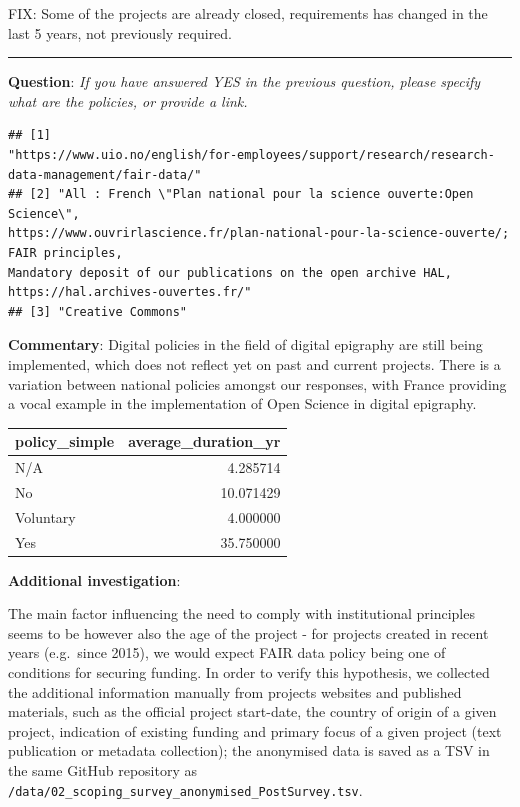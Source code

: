 \documentclass[
  12pt,
]{scrreprt}
\begin{document}
FIX: Some of the projects are already closed, requirements has changed
in the last 5 years, not previously required.

\begin{center}\rule{0.5\linewidth}{0.5pt}\end{center}

\textbf{Question}: \emph{If you have answered YES in the previous
question, please specify what are the policies, or provide a link.}

\begin{verbatim}
## [1]
"https://www.uio.no/english/for-employees/support/research/research-data-management/fair-data/"
## [2] "All : French \"Plan national pour la science ouverte:Open Science\",
https://www.ouvrirlascience.fr/plan-national-pour-la-science-ouverte/; FAIR principles,
Mandatory deposit of our publications on the open archive HAL,
https://hal.archives-ouvertes.fr/"
## [3] "Creative Commons"
\end{verbatim}

\textbf{Commentary}: Digital policies in the field of digital epigraphy
are still being implemented, which does not reflect yet on past and
current projects. There is a variation between national policies amongst
our responses, with France providing a vocal example in the
implementation of Open Science in digital epigraphy.

\begin{longtable}[]{@{}lr@{}}
\toprule
policy\_simple & average\_duration\_yr \\
\midrule
\endhead
N/A & 4.285714 \\
No & 10.071429 \\
Voluntary & 4.000000 \\
Yes & 35.750000 \\
\bottomrule
\end{longtable}

\textbf{Additional investigation}:

The main factor influencing the need to comply with institutional
principles seems to be however also the age of the project - for
projects created in recent years (e.g.~since 2015), we would expect FAIR
data policy being one of conditions for securing funding. In order to
verify this hypothesis, we collected the additional information manually
from projects websites and published materials, such as the official
project start-date, the country of origin of a given project, indication
of existing funding and primary focus of a given project (text
publication or metadata collection); the anonymised data is saved as a
TSV in the same GitHub repository as
\texttt{/data/02\_scoping\_survey\_anonymised\_PostSurvey.tsv}.
\end{document}
